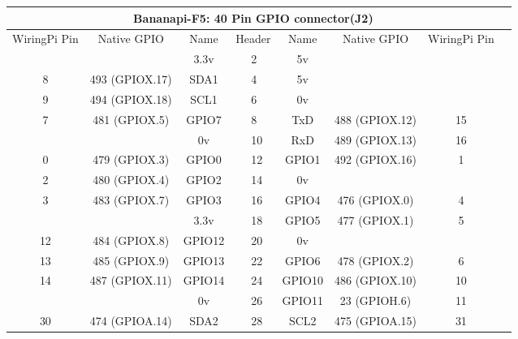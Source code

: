 \documentclass[11pt,a4paper]{article}
\begin{document}
\begin{sffamily}
\begin{center}
\begin{tabular}{|c|c|c||p{8mm}|p{8mm}||c|c|c|c|}
\hline
\multicolumn{8}{|c|}{\bfseries{Bananapi-F5: 40 Pin GPIO connector(J2)}}\\
\hline
\hline
WiringPi Pin	& Native GPIO	& Name	& \multicolumn{2}{|c||}{Header}	& Name	& Native GPIO	& WiringPi Pin\\
\hline
\hline
	& 					& \textcolor{rtb-red}{3.3v}		& \raggedleft{1} &  2 & \textcolor{rtb-maroon}{5v}		&			 		& \\
\hline
8	& 493 (GPIOX.17)	& \textcolor{rtb-aqua}{SDA1}	& \raggedleft{3} &  4 & \textcolor{rtb-maroon}{5v}		& 					& \\
\hline
9	& 494 (GPIOX.18)	& \textcolor{rtb-aqua}{SCL1}	& \raggedleft{5} &  6 & \textcolor{rtb-black}{0v}		& 					& \\
\hline
7	& 481 (GPIOX.5)		& \textcolor{rtb-green}{GPIO7}	& \raggedleft{7} &  8 & \textcolor{rtb-yellow}{TxD}		& 488 (GPIOX.12)	& 15\\
\hline
	&			 		& \textcolor{rtb-black}{0v}		& \raggedleft{9} & 10 & \textcolor{rtb-yellow}{RxD}		& 489 (GPIOX.13)	& 16\\
\hline
0	& 479 (GPIOX.3)		& \textcolor{rtb-green}{GPIO0}	& \raggedleft{11} & 12 & \textcolor{rtb-green}{GPIO1}	& 492 (GPIOX.16)	& 1\\
\hline
2	& 480 (GPIOX.4)		& \textcolor{rtb-green}{GPIO2}	& \raggedleft{13} & 14 & \textcolor{rtb-black}{0v}		& 					& \\
\hline
3	& 483 (GPIOX.7)		& \textcolor{rtb-green}{GPIO3}	& \raggedleft{15} & 16 & \textcolor{rtb-green}{GPIO4}	& 476 (GPIOX.0)		& 4\\
\hline
	& 					& \textcolor{rtb-red}{3.3v}		& \raggedleft{17} & 18 & \textcolor{rtb-green}{GPIO5}	& 477 (GPIOX.1)		& 5\\
\hline
12	& 484 (GPIOX.8)		& \textcolor{rtb-green}{GPIO12}	& \raggedleft{19} & 20 & \textcolor{rtb-black}{0v}		& 					& \\
\hline
13	& 485 (GPIOX.9)	& \textcolor{rtb-green}{GPIO13}	& \raggedleft{21} & 22 & \textcolor{rtb-green}{GPIO6}	& 478 (GPIOX.2)		& 6\\
\hline
14	& 487 (GPIOX.11)	& \textcolor{rtb-green}{GPIO14}	& \raggedleft{23} & 24 & \textcolor{rtb-green}{GPIO10}	& 486 (GPIOX.10)	& 10\\
\hline
	& 					& \textcolor{rtb-black}{0v}		& \raggedleft{25} & 26 & \textcolor{rtb-green}{GPIO11}	& 23 (GPIOH.6)	& 11\\
\hline
30	& 474 (GPIOA.14)	& \textcolor{rtb-aqua}{SDA2}	& \raggedleft{27} & 28 & \textcolor{rtb-aqua}{SCL2}		& 475 (GPIOA.15)	& 31\\

\end{tabular}
\end{center}
\end{sffamily}
\end{document}
